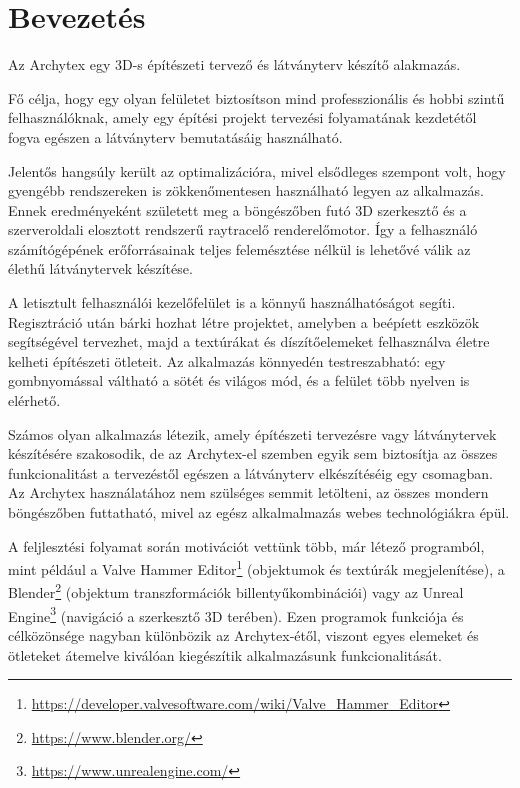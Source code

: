 \part{Bevezetés}

Az Archytex egy 3D-s építészeti tervező és látványterv készítő alakmazás.

Fő célja, hogy egy olyan felületet biztosítson mind professzionális és hobbi szintű felhasználóknak, amely egy építési projekt tervezési folyamatának kezdetétől fogva egészen a látványterv bemutatásáig használható.

Jelentős hangsúly került az optimalizációra, mivel elsődleges szempont volt, hogy gyengébb rendszereken is zökkenőmentesen használható legyen az alkalmazás. Ennek eredményeként született meg a böngészőben futó 3D szerkesztő és a szerveroldali elosztott rendszerű raytracelő renderelőmotor. Így a felhasználó számítógépének erőforrásainak teljes felemésztése nélkül is lehetővé válik az élethű látványtervek készítése.

A letisztult felhasználói kezelőfelület is a könnyű használhatóságot segíti. Regisztráció után bárki hozhat létre projektet, amelyben a beépíett eszközök segítségével tervezhet, majd a textúrákat és díszítőelemeket felhasználva életre kelheti építészeti ötleteit. Az alkalmazás könnyedén testreszabható: egy gombnyomással váltható a sötét és világos mód, és a felület több nyelven is elérhető.

Számos olyan alkalmazás létezik, amely építészeti tervezésre vagy látványtervek készítésére szakosodik, de az Archytex-el szemben egyik sem biztosítja az összes funkcionalitást a tervezéstől egészen a látványterv elkészítéséig egy csomagban. Az Archytex használatához nem szülséges semmit letölteni, az összes mondern böngészőben futtatható, mivel az egész alkalmalmazás webes technológiákra épül.

A feljlesztési folyamat során motivációt vettünk több, már létező programból, mint például a Valve Hammer Editor\footnote{\url{https://developer.valvesoftware.com/wiki/Valve\_Hammer\_Editor}} (objektumok és textúrák megjelenítése), a Blender\footnote{\url{https://www.blender.org/}} (objektum transzformációk billentyűkombinációi) vagy az Unreal Engine\footnote{\url{https://www.unrealengine.com/}} (navigáció a szerkesztő 3D terében). Ezen programok funkciója és célközönsége nagyban különbözik az Archytex-étől, viszont egyes elemeket és ötleteket átemelve kiválóan kiegészítik alkalmazásunk funkcionalitását.